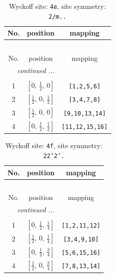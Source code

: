 \documentclass[fleqn,8pt]{jsarticle}
\begin{document}
\begin{longtable}{ccc}
\caption{Wyckoff site: {\tt 4e}, site symmetry: {\tt 2/m..}}
 \\
 \hline \hline
No. & position & mapping \\ \hline \endfirsthead

\multicolumn{2}{l}{\tablename\ \thetable{}} \\
 \hline \hline
No. & position & mapping \\ \hline \endhead

 \hline \hline
\multicolumn{2}{r}{\footnotesize\it continued ...} \\ \endfoot

 \hline \hline
\multicolumn{2}{r}{} \\ \endlastfoot

1 & $\left[ 0,\, \frac{1}{2},\, 0 \right]$ & {\tt [1,2,5,6]} \\ \hline
2 & $\left[ \frac{1}{2},\, 0,\, \frac{1}{2} \right]$ & {\tt [3,4,7,8]} \\ \hline
3 & $\left[ \frac{1}{2},\, 0,\, 0 \right]$ & {\tt [9,10,13,14]} \\ \hline
4 & $\left[ 0,\, \frac{1}{2},\, \frac{1}{2} \right]$ & {\tt [11,12,15,16]} \\
\end{longtable}
\renewcommand{\arraystretch}{1.2}
\begin{longtable}{ccc}
\caption{Wyckoff site: {\tt 4f}, site symmetry: {\tt 22'2'.}}
 \\
 \hline \hline
No. & position & mapping \\ \hline \endfirsthead

\multicolumn{2}{l}{\tablename\ \thetable{}} \\
 \hline \hline
No. & position & mapping \\ \hline \endhead

 \hline \hline
\multicolumn{2}{r}{\footnotesize\it continued ...} \\ \endfoot

 \hline \hline
\multicolumn{2}{r}{} \\ \endlastfoot

1 & $\left[ 0,\, \frac{1}{2},\, \frac{1}{4} \right]$ & {\tt [1,2,11,12]} \\ \hline
2 & $\left[ \frac{1}{2},\, 0,\, \frac{1}{4} \right]$ & {\tt [3,4,9,10]} \\ \hline
3 & $\left[ 0,\, \frac{1}{2},\, \frac{3}{4} \right]$ & {\tt [5,6,15,16]} \\ \hline
4 & $\left[ \frac{1}{2},\, 0,\, \frac{3}{4} \right]$ & {\tt [7,8,13,14]} \\
\end{longtable}
\end{document}
